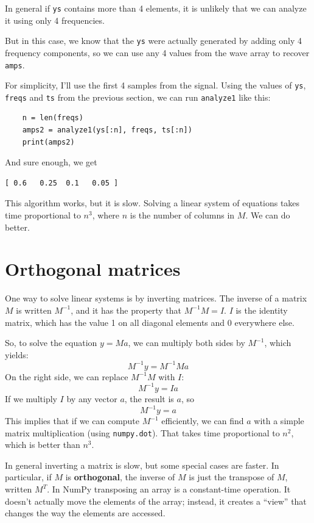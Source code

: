 \documentclass[12pt]{book}
\begin{document}
In general if {\tt ys}
contains more than 4 elements, it is unlikely that we can analyze it
using only 4 frequencies.

But in this case, we know that the {\tt ys} were actually generated by
adding only 4 frequency components, so we can use any 4 values from
the wave array to recover {\tt amps}.

For simplicity, I'll use the first 4 samples from
the signal.
Using the values of {\tt ys}, {\tt freqs} and {\tt ts} from
the previous section, we can run {\tt analyze1} like this:

\begin{verbatim}
    n = len(freqs)
    amps2 = analyze1(ys[:n], freqs, ts[:n])
    print(amps2)
\end{verbatim}

And sure enough, we get

\begin{verbatim}
[ 0.6   0.25  0.1   0.05 ]
\end{verbatim}

This algorithm works, but it is slow.  Solving a linear
system of equations takes time proportional to $n^3$, where $n$ is
the number of columns in $M$.  We can do better.


\section{Orthogonal matrices}

One way to solve linear systems is by inverting matrices.  The
inverse of a matrix $M$ is written $M^{-1}$, and it has the property
that $M^{-1}M = I$.  $I$ is the identity matrix, which has
the value 1 on all diagonal elements and 0 everywhere else.

So, to solve the equation $y = Ma$, we can multiply both sides by
$M^{-1}$, which yields:
%
\[ M^{-1}y = M^{-1} M a \]
%
On the right side, we can replace $M^{-1}M$ with $I$:
%
\[ M^{-1}y = I a \]
%
If we multiply $I$ by any vector $a$, the result is $a$, so  
%
\[ M^{-1}y = a \]
%
This implies that if we can compute $M^{-1}$ efficiently, we can find
$a$ with a simple matrix multiplication (using {\tt numpy.dot}).  That
takes time proportional to $n^2$, which is better than $n^3$.

In general inverting a matrix is slow, but some special cases are
faster.  In particular, if $M$ is {\bf orthogonal}, the inverse of $M$
is just the transpose of $M$, written $M^T$.  In NumPy
transposing an array is a constant-time operation.  It
doesn't actually move the elements of the array; instead, it creates a
``view'' that changes the way the elements are accessed.
\end{document}
